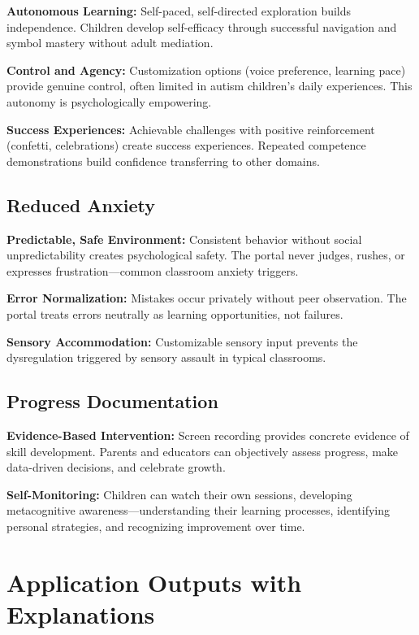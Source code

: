 \documentclass[11pt, a4paper]{article}
\begin{document}
\textbf{Autonomous Learning:} Self-paced, self-directed exploration builds independence. Children develop self-efficacy through successful navigation and symbol mastery without adult mediation.

\textbf{Control and Agency:} Customization options (voice preference, learning pace) provide genuine control, often limited in autism children's daily experiences. This autonomy is psychologically empowering.

\textbf{Success Experiences:} Achievable challenges with positive reinforcement (confetti, celebrations) create success experiences. Repeated competence demonstrations build confidence transferring to other domains.

\subsection{Reduced Anxiety}

\textbf{Predictable, Safe Environment:} Consistent behavior without social unpredictability creates psychological safety. The portal never judges, rushes, or expresses frustration—common classroom anxiety triggers.

\textbf{Error Normalization:} Mistakes occur privately without peer observation. The portal treats errors neutrally as learning opportunities, not failures.

\textbf{Sensory Accommodation:} Customizable sensory input prevents the dysregulation triggered by sensory assault in typical classrooms.

\subsection{Progress Documentation}

\textbf{Evidence-Based Intervention:} Screen recording provides concrete evidence of skill development. Parents and educators can objectively assess progress, make data-driven decisions, and celebrate growth.

\textbf{Self-Monitoring:} Children can watch their own sessions, developing metacognitive awareness—understanding their learning processes, identifying personal strategies, and recognizing improvement over time.

\newpage

\section{Application Outputs with Explanations}
\end{document}

